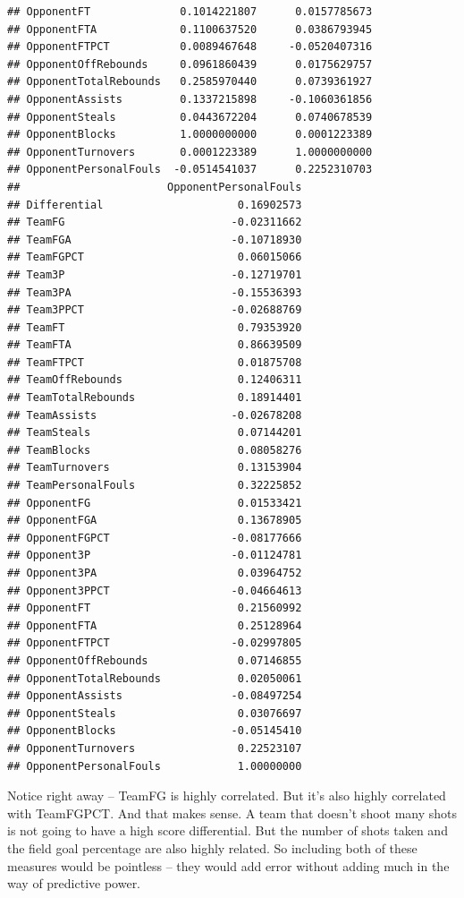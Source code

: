 \documentclass[]{book}
\begin{document}
\begin{verbatim}
## OpponentFT              0.1014221807      0.0157785673
## OpponentFTA             0.1100637520      0.0386793945
## OpponentFTPCT           0.0089467648     -0.0520407316
## OpponentOffRebounds     0.0961860439      0.0175629757
## OpponentTotalRebounds   0.2585970440      0.0739361927
## OpponentAssists         0.1337215898     -0.1060361856
## OpponentSteals          0.0443672204      0.0740678539
## OpponentBlocks          1.0000000000      0.0001223389
## OpponentTurnovers       0.0001223389      1.0000000000
## OpponentPersonalFouls  -0.0514541037      0.2252310703
##                       OpponentPersonalFouls
## Differential                     0.16902573
## TeamFG                          -0.02311662
## TeamFGA                         -0.10718930
## TeamFGPCT                        0.06015066
## Team3P                          -0.12719701
## Team3PA                         -0.15536393
## Team3PPCT                       -0.02688769
## TeamFT                           0.79353920
## TeamFTA                          0.86639509
## TeamFTPCT                        0.01875708
## TeamOffRebounds                  0.12406311
## TeamTotalRebounds                0.18914401
## TeamAssists                     -0.02678208
## TeamSteals                       0.07144201
## TeamBlocks                       0.08058276
## TeamTurnovers                    0.13153904
## TeamPersonalFouls                0.32225852
## OpponentFG                       0.01533421
## OpponentFGA                      0.13678905
## OpponentFGPCT                   -0.08177666
## Opponent3P                      -0.01124781
## Opponent3PA                      0.03964752
## Opponent3PPCT                   -0.04664613
## OpponentFT                       0.21560992
## OpponentFTA                      0.25128964
## OpponentFTPCT                   -0.02997805
## OpponentOffRebounds              0.07146855
## OpponentTotalRebounds            0.02050061
## OpponentAssists                 -0.08497254
## OpponentSteals                   0.03076697
## OpponentBlocks                  -0.05145410
## OpponentTurnovers                0.22523107
## OpponentPersonalFouls            1.00000000
\end{verbatim}

Notice right away -- TeamFG is highly correlated. But it's also highly
correlated with TeamFGPCT. And that makes sense. A team that doesn't
shoot many shots is not going to have a high score differential. But the
number of shots taken and the field goal percentage are also highly
related. So including both of these measures would be pointless -- they
would add error without adding much in the way of predictive power.
\end{document}
